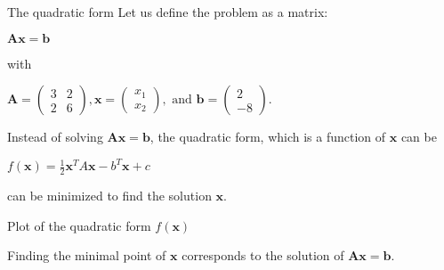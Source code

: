\documentclass[12pt,t]{beamer}
\begin{document}
\begin{frame}{The quadratic form}
Let us define the problem as a matrix:\\
\begin{center}
$\mathbf{A} \mathbf{x}=\mathbf{b}$
\end{center}
with 
\begin{center}
$\mathbf{A} = \begin{pmatrix}
 3 & 2 \\ 2 & 6 
\end{pmatrix}, \mathbf{x}=\begin{pmatrix}
x_1 \\ x_2  
\end{pmatrix}, \text{ and }  \mathbf{b}=\begin{pmatrix}
2 \\ -8  
\end{pmatrix}\text{.}$
\end{center}
\vspace{0.25cm}


Instead of solving $\mathbf{A}\mathbf{x}=\mathbf{b}$, the quadratic form, which is a function of $\mathbf{x}$ can be 

\begin{center}
$ f(\mathbf{x}) = \frac{1}{2} \mathbf{x}^T A \mathbf{x} - b^T \mathbf{x} + c$
\end{center}
can be minimized to find the solution $\mathbf{x}$.
\vspace{0.25cm}

\end{frame}

\begin{frame}{Plot of the quadratic form $f(\mathbf{x})$}

\begin{center}
\end{center}
\vspace{-0.5cm}
Finding the minimal point of $\mathbf{x}$ corresponds to the solution of $\mathbf{A} \mathbf{x}=\mathbf{b}$.
\end{frame}
\end{document}
